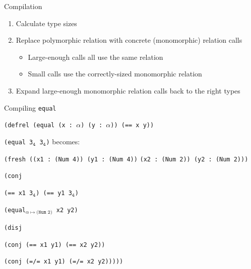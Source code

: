 \documentclass{beamer}
\begin{document}
\begin{frame}{Compilation}

	\begin{enumerate}
		\item<2-> Calculate type sizes
		\item<1-> Replace polymorphic relation  with concrete (monomorphic) relation calls
			\begin{itemize}
				\item Large-enough calls all use the same relation
				\item Small calls use the correctly-sized monomorphic relation
			\end{itemize}
		\item<3-> Expand large-enough monomorphic relation calls back to the right types
	\end{enumerate}

	\vspace{1ex}


	\vspace{1ex}


\end{frame}


\begin{frame}{Compiling \texttt{equal}}

	\texttt{(defrel (equal (x : \(\alpha\)) (y : \(\alpha\))) (== x y))}

	\vspace{1ex}

	\texttt{(equal 3\(_\mathtt{4}\) 3\(_\mathtt{4}\))} becomes:

	\vspace{1ex}
	
	\texttt{(fresh ((x1 : (Num 4)) (y1 : (Num 4))}
	\quad\texttt{(x2 : (Num 2)) (y2 : (Num 2)))}

	\quad\texttt{(conj}

	\quad\quad\texttt{(== x1 3\(_\mathtt{4}\)) (== y1 3\(_\mathtt{4}\))}

	\quad\quad\texttt{(equal\(_{\alpha \mapsto \texttt{(Num 2)}}\) x2 y2)}

	\quad\quad\texttt{(disj}

	\quad\quad\quad\texttt{(conj (== x1 y1) (== x2 y2))}

	\quad\quad\quad\texttt{(conj (=/= x1 y1) (=/= x2 y2)))))}

\end{frame}
\end{document}
